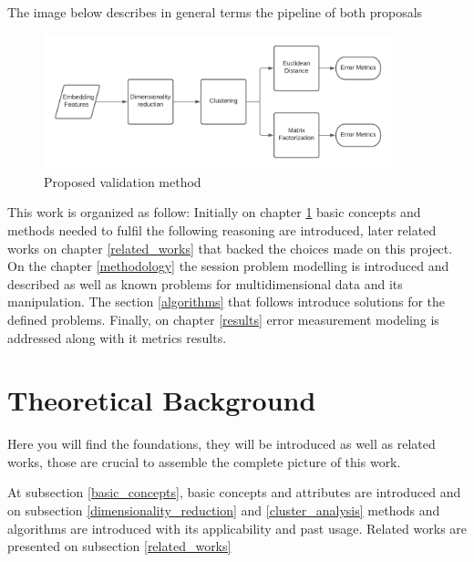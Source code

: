 \documentclass[ecp,tc,english]{iiufrgs}
\begin{document}
The image below describes in general terms the pipeline of both proposals

\begin{figure}[H]
    \centering
    \includegraphics[width=0.9\textwidth]{images/experiment.png}
    \caption{Proposed validation method}
    \label{fig:method_architecture}
\end{figure}

This work is organized as follow: Initially on chapter \ref{theoretical_background_and_related_work} basic concepts and methods needed to fulfil the following reasoning are introduced, later related works on chapter \ref{related_works} that backed the choices made on this project. On the chapter \ref{methodology} the session problem modelling is introduced and described as well as known problems for multidimensional data and its manipulation. The section \ref{algorithms} that follows introduce solutions for the defined problems.
Finally, on chapter \ref{results} error measurement modeling is addressed along with it metrics results.


\chapter{Theoretical Background} \label{theoretical_background_and_related_work}
Here you will find the foundations, they will be introduced as well as related works, those are crucial to assemble the complete picture of this work.

At subsection \ref{basic_concepts}, basic concepts and attributes are introduced and on subsection \ref{dimensionality_reduction} and \ref{cluster_analysis} methods and algorithms are introduced with its applicability and past usage. Related works are presented on subsection \ref{related_works}
\end{document}
